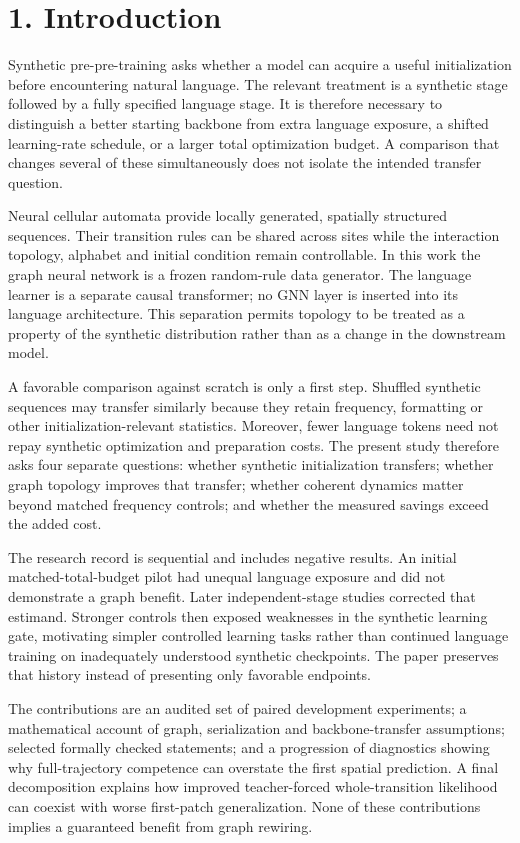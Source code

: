 \documentclass[11pt,a4paper]{article}
\begin{document}
\section*{1. Introduction}
Synthetic pre-pre-training asks whether a model can acquire a useful initialization before encountering natural language. The relevant treatment is a synthetic stage followed by a fully specified language stage. It is therefore necessary to distinguish a better starting backbone from extra language exposure, a shifted learning-rate schedule, or a larger total optimization budget. A comparison that changes several of these simultaneously does not isolate the intended transfer question.

Neural cellular automata provide locally generated, spatially structured sequences. Their transition rules can be shared across sites while the interaction topology, alphabet and initial condition remain controllable. In this work the graph neural network is a frozen random-rule data generator. The language learner is a separate causal transformer; no GNN layer is inserted into its language architecture. This separation permits topology to be treated as a property of the synthetic distribution rather than as a change in the downstream model.

A favorable comparison against scratch is only a first step. Shuffled synthetic sequences may transfer similarly because they retain frequency, formatting or other initialization-relevant statistics. Moreover, fewer language tokens need not repay synthetic optimization and preparation costs. The present study therefore asks four separate questions: whether synthetic initialization transfers; whether graph topology improves that transfer; whether coherent dynamics matter beyond matched frequency controls; and whether the measured savings exceed the added cost.

The research record is sequential and includes negative results. An initial matched-total-budget pilot had unequal language exposure and did not demonstrate a graph benefit. Later independent-stage studies corrected that estimand. Stronger controls then exposed weaknesses in the synthetic learning gate, motivating simpler controlled learning tasks rather than continued language training on inadequately understood synthetic checkpoints. The paper preserves that history instead of presenting only favorable endpoints.

The contributions are an audited set of paired development experiments; a mathematical account of graph, serialization and backbone-transfer assumptions; selected formally checked statements; and a progression of diagnostics showing why full-trajectory competence can overstate the first spatial prediction. A final decomposition explains how improved teacher-forced whole-transition likelihood can coexist with worse first-patch generalization. None of these contributions implies a guaranteed benefit from graph rewiring.
\end{document}
